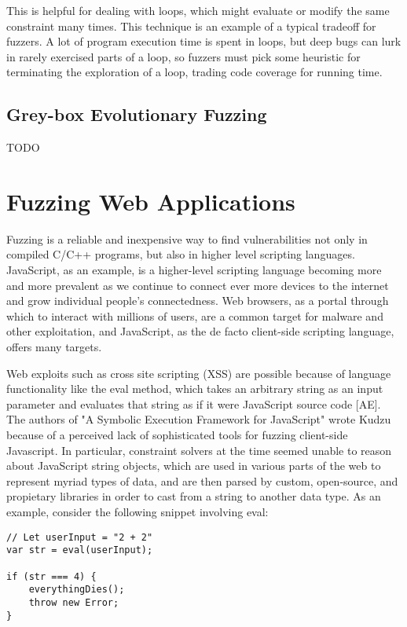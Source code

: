 \documentclass[11pt,expanded,copyright]{fsuthesis}
\begin{document}
This is helpful for dealing with loops, which might evaluate or modify the same constraint many times. This technique is an example of a typical tradeoff for fuzzers. A lot of program execution time is spent in loops, but deep bugs can lurk in rarely exercised parts of a loop, so fuzzers must pick some heuristic for terminating the exploration of a loop, trading code coverage for running time.

\subsection{Grey-box Evolutionary Fuzzing}

TODO

\section{Fuzzing Web Applications}

Fuzzing is a reliable and inexpensive way to find vulnerabilities not only in compiled C/C++ programs, but also in higher level scripting languages. JavaScript, as an example, is a higher-level scripting language becoming more and more prevalent as we continue to connect ever more devices to the internet and grow individual people's connectedness. Web browsers, as a portal through which to interact with millions of users, are a common target for malware and other exploitation, and JavaScript, as the de facto client-side scripting language, offers many targets. 

Web exploits such as cross site scripting (XSS) are possible because of language functionality like the eval method, which takes an arbitrary string as an input parameter and evaluates that string as if it were JavaScript source code [AE]. The authors of "A Symbolic Execution Framework for JavaScript" wrote Kudzu because of a perceived lack of sophisticated tools for fuzzing client-side Javascript. In particular, constraint solvers at the time seemed unable to reason about JavaScript string objects, which are used in various parts of the web to represent myriad types of data, and are then parsed by custom, open-source, and propietary libraries in order to cast from a string to another data type. As an example, consider the following snippet involving eval:

\begin{lstlisting}[style=jsstyle]
// Let userInput = "2 + 2"
var str = eval(userInput); 

if (str === 4) {
	everythingDies();
	throw new Error;
}
\end{lstlisting}
\end{document}
